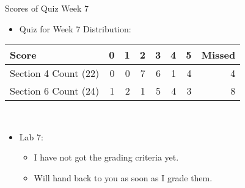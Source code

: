 \documentclass[presentation]{beamer}
\begin{document}
\begin{frame}[label=sec-6]{Scores of Quiz Week 7}
\\
\begin{itemize}
\item \alert{Quiz for Week 7} Distribution:
\end{itemize}
\begin{center}
\begin{tabular}{lrrrrrrr}
\hline
Score & 0 & 1 & 2 & 3 & 4 & 5 & Missed\\
\hline
Section \alert{4} Count (22) & 0 & 0 & 7 & 6 & 1 & 4 & 4\\
\hline
Section \alert{6} Count (24) & 1 & 2 & 1 & 5 & 4 & 3 & 8\\
\hline
\end{tabular}
\end{center}
\\
\begin{itemize}
\item \alert{Lab 7}:

\begin{itemize}
\item I have not got the grading criteria yet.
\item Will hand back to you as soon as I grade them.
\end{itemize}
\end{itemize}
\end{frame}
\end{document}
